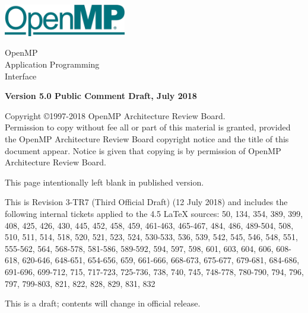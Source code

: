 
  \begin{titlepage}
    \begin{flushleft}
     \hspace{-6em} \includegraphics[width=0.4\textwidth]{openmp-logo.png}
    \end{flushleft}

    \begin{adjustwidth}{-0.75in}{0in}
    \begin{center}
      \Huge
      \textsf{OpenMP\\Application Programming\\Interface}

      \vspace{0.5in}\textsf{    }\vspace{-0.7in}
      \normalsize

      \vspace{1.0in}

      \textbf{Version 5.0 Public Comment Draft, July 2018}
    \end{center}
    \end{adjustwidth}

    \vspace{3.0in}

\begin{adjustwidth}{0pt}{1em}\setlength{\parskip}{0.25\baselineskip}%
Copyright \copyright 1997-2018 OpenMP Architecture Review Board.\\
Permission to copy without fee all or part of this material is granted,
provided the OpenMP Architecture Review Board copyright notice and
the title of this document appear. Notice is given that copying is by
permission of OpenMP Architecture Review Board.\end{adjustwidth}

  \end{titlepage}


\clearpage
\thispagestyle{empty}
\phantom{a}
This page intentionally left blank in published version.

This is Revision 3-TR7 (Third Official Draft) (12 July 2018) and
includes the following internal tickets applied to the 4.5 LaTeX sources:
50, 134, 354, 389, 399, 408, 425, 426, 430, 445, 452, 458, 459, 461-463, 
465-467, 484, 486, 489-504, 508, 510, 511, 514, 518, 520, 521, 523, 
524, 530-533, 536, 539, 542, 545, 546, 548, 551, 555-562, 564, 568-578, 
581-586, 589-592, 594, 597, 598, 601, 603, 604, 606, 608-618, 620-646, 
648-651, 654-656, 659, 661-666, 668-673, 675-677, 679-681, 684-686, 
691-696, 699-712, 715, 717-723, 725-736, 738, 740, 745, 748-778, 780-790, 
794, 796, 797, 799-803, 821, 822, 828, 829, 831, 832

This is a draft; contents will change in official release.

\vfill

